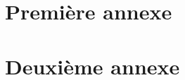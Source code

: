 \documentclass[12pt,a4paper,oneside, titlepage]{report}
\begin{document}
\newpage
\appendix
{}

\chapter{Premi\`ere annexe}
\renewcommand{\leftmark}{ANNEXE \thechapter.~~Premi\`ere annexe}
\label{annexe1}

\chapter{Deuxi\`eme annexe}
\renewcommand{\leftmark}{ANNEXE \thechapter.~~Deuxi\`eme annexe}
\label{annexe2}

\end{document}
